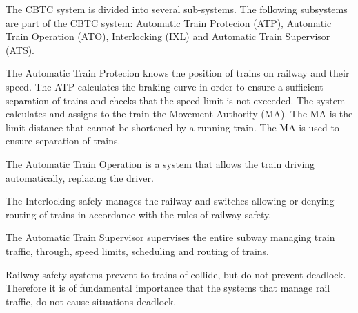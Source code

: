 \documentclass{ewic}
\begin{document}
The CBTC system is divided into several sub-systems. The following subsystems are part of the CBTC system: Automatic Train Protecion (ATP), Automatic Train Operation (ATO), Interlocking (IXL) and Automatic Train Supervisor (ATS).

 
The Automatic Train Protecion knows the position of trains on railway and their speed. The ATP calculates the braking curve in order to ensure a sufficient separation of trains and checks that the speed limit is not exceeded. The system calculates and assigns to the train the Movement Authority (MA). The MA is the limit distance that cannot be shortened by a running train. The MA is used to ensure separation of trains.
 
 
The Automatic Train Operation is a system that allows the train driving automatically, replacing the driver.
 

The Interlocking safely manages the railway and switches allowing or denying routing of trains in accordance with the rules of railway safety.

The Automatic Train Supervisor supervises the entire subway managing train traffic, through, speed limits, scheduling and routing of trains.

Railway safety systems prevent to trains of collide, but do not prevent deadlock. Therefore it is of fundamental importance that the systems that manage rail traffic, do not cause situations deadlock.
\end{document}
